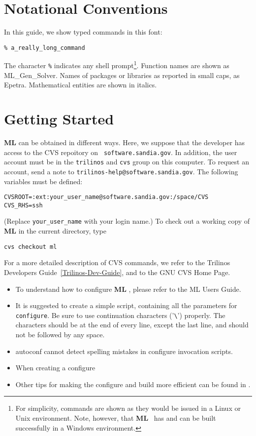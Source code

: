 \documentclass[10pt,letter,relax]{SANDreport}
\newcommand{\ML}     {{\bf ML }}
\begin{document}
\section{Notational Conventions}

In this guide, we show typed commands in this font:
\begin{verbatim}
% a_really_long_command
\end{verbatim}
The character \verb!%! indicates any shell prompt\footnote{For
  simplicity, commands are shown as they would be issued in a Linux or
  Unix environment.  Note, however, that \ML\ has and can be built
  successfully in a Windows environment.}.
Function names are shown as {\sf ML\_Gen\_Solver}.  Names of packages or
libraries as reported in small caps, as {\sc Epetra}. Mathematical
entities are shown in italics.


\section{Getting Started}
\label{started}

\ML can be obtained in different ways. Here, we suppose that the
developer has access to the CVS repoitory on {\tt
  software.sandia.gov}. In addition, the user account must be in the
{\tt trilinos} and {\tt cvs} group on this computer. To request an
account, send a note to {\tt trilinos-help@software.sandia.gov}.  The
following variables must be defined:
\begin{verbatim}
CVSROOT=:ext:your_user_name@software.sandia.gov:/space/CVS
CVS_RHS=ssh
\end{verbatim}
(Replace \verb!your_user_name! with your login name.) To check out a
working copy of \ML in the current directory, type
\begin{verbatim}
cvs checkout ml
\end{verbatim}
For a more detailed description of CVS commands, we refer to the
Trilinos Developers Guide~\ref{Trilinos-Dev-Guide}, and to the GNU CVS Home
Page.

\begin{itemize}
\item To understand how to configure \ML, please refer to the ML Users
Guide.
\item It is suggested to create a simple script, containing all the
  parameters for {\tt configure}. Be sure to use continuation characters
  ('\verb!\!') properly. The characters should be at the end of every
  line, except the last line, and should not be followed by any space.
\item autoconf cannot detect spelling mistakes in configure invocation scripts.
\item When creating a configure 
\item Other tips for making the configure and build more efficient can
  be found in \cite[Section 2.6]{Trilinos-Dev-Guide}.
\end{itemize}
\end{document}
